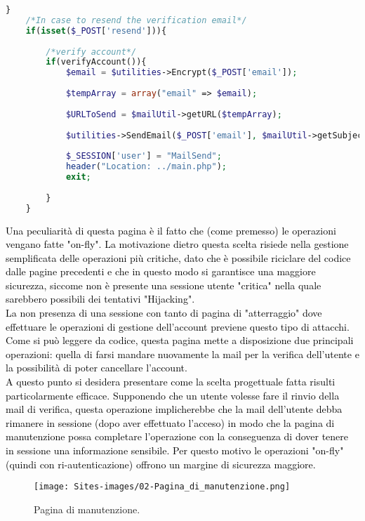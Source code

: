 \begin{lstlisting}[language=php]
	}
	/*In case to resend the verification email*/
	if(isset($_POST['resend'])){
		
		/*verify account*/
		if(verifyAccount()){
			$email = $utilities->Encrypt($_POST['email']);
			
			$tempArray = array("email" => $email);
			
			$URLToSend = $mailUtil->getURL($tempArray);
			
			$utilities->SendEmail($_POST['email'], $mailUtil->getSubject(), $mailUtil->getBody($URLToSend), $mailUtil->getAlternativeBody($URLToSend));
			
			$_SESSION['user'] = "MailSend";
			header("Location: ../main.php");
			exit;
			
		}
	}
\end{lstlisting}

\textcolor{black}{Una peculiarità di questa pagina è il fatto che (come premesso) le operazioni vengano fatte "on-fly". La motivazione dietro questa scelta risiede nella gestione semplificata delle operazioni più critiche, dato che è possibile riciclare del codice dalle pagine precedenti e che in questo modo si garantisce una maggiore sicurezza, siccome non è presente una sessione utente "critica" nella quale sarebbero possibili dei tentativi "Hijacking". \\
La non presenza di una sessione con tanto di pagina di "atterraggio" dove effettuare le operazioni di gestione dell'account previene questo tipo di attacchi.\\
Come si può leggere da codice, questa pagina mette a disposizione due principali operazioni: quella di farsi mandare nuovamente la mail per la verifica dell'utente e la possibilità di poter cancellare l'account.\\
A questo punto si desidera presentare come la scelta progettuale fatta risulti particolarmente efficace. Supponendo che un utente volesse fare il rinvio della mail di verifica, questa operazione implicherebbe che la mail dell'utente debba rimanere in sessione (dopo aver effettuato l'acceso) in modo che la pagina di manutenzione possa completare l'operazione con la conseguenza di dover tenere in sessione una informazione sensibile. Per questo motivo le operazioni "on-fly" (quindi con ri-autenticazione) offrono un margine di sicurezza maggiore.}\\

\begin{figure}[H]
	\begin{center}
		\texttt{[image: Sites-images/02-Pagina\_di\_manutenzione.png]}
		\caption{Pagina di manutenzione.}
	\end{center}
\end{figure}

